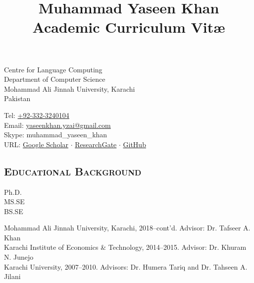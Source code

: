 \documentclass[a4paper, 10pt]{article}
\title{{\Huge Muhammad Yaseen Khan}\\\small Academic Curriculum Vit\ae}
\author{}
\date{}
\begin{document}
\maketitle
\vspace{-3em}
\begin{minipage}{0.45\textwidth}
Centre for Language Computing\\
Department of Computer Science\\
Mohammad Ali Jinnah University, Karachi\\
Pakistan
\end{minipage}
\hfill
\begin{minipage}{0.45\textwidth}
Tel: \href{tel:+923323240104}{+92-332-3240104}\\
Email: \href{mailto:yaseenkhan.yzai@gmail.com}{yaseenkhan.yzai@gmail.com}\\
Skype: muhammad\_yaseen\_khan\\
URL: \href{https://scholar.google.com/citations?user=a_d2KTEAAAAJ&hl=en}{Google Scholar} $\cdot$ \href{https://www.researchgate.net/profile/Muhammad_Yaseen_Khan}{ResearchGate} $\cdot$ \href{https://www.github.com/MuhammadYaseenKhan}{GitHub}
\end{minipage}


\subsection*{\normalfont\textsc{\bf Educational Background}}
\hfill\begin{minipage}{0.09\textwidth}
Ph.D.\\
MS.SE\\
BS.SE
\end{minipage}%
\begin{minipage}{0.89\textwidth}
Mohammad Ali Jinnah University, Karachi, 2018--cont'd. Advisor: Dr. Tafseer A. Khan\\
Karachi Institute of Economics \& Technology, 2014--2015. Advisor: Dr. Khuram N. Junejo\\
Karachi University, 2007--2010. Advisors: Dr. Humera Tariq and Dr. Tahseen A. Jilani
\end{minipage}

\end{document}
